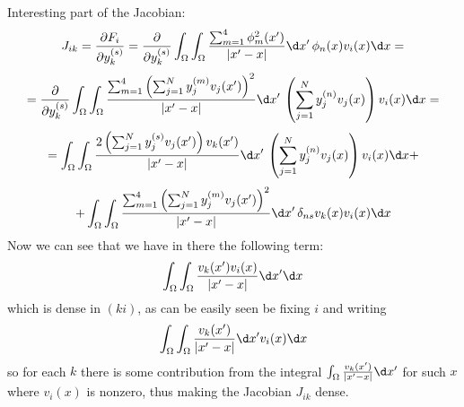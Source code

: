 \documentclass[11pt]{article}
\begin{document}
Interesting part of the Jacobian:
$$J_{ik} = {\partial F_i\over\partial y_k^{(s)}} =
{\partial\over\partial y_k^{(s)}}\int_\Omega \int_\Omega {
\sum_{m=1}^4 \phi_m^2(x')
\over|x' - x|}\d x'\,\phi_n(x) v_i(x) \d x =
$$
$$
=
{\partial\over\partial y_k^{(s)}}\int_\Omega \int_\Omega {
\sum_{m=1}^4 \left(\sum_{j=1}^N y_j^{(m)} v_j(x')\right)^2
\over|x' - x|}\d x'\, \left(\sum_{j=1}^N y_j^{(n)} v_j(x)\right)  v_i(x) \d x =
$$
$$
=
\int_\Omega \int_\Omega {
2 \left(\sum_{j=1}^N y_j^{(s)} v_j(x')\right)v_k(x')
\over|x' - x|}\d x'\, \left(\sum_{j=1}^N y_j^{(n)} v_j(x)\right)  v_i(x) \d x +
$$
$$+
\int_\Omega \int_\Omega {
\sum_{m=1}^4 \left(\sum_{j=1}^N y_j^{(m)} v_j(x')\right)^2
\over|x' - x|}\d x'\, \delta_{ns}v_k(x)  v_i(x) \d x
$$
Now we can see that we have in there the following term:
$$
\int_\Omega \int_\Omega {v_k(x') v_i(x)\over |x'-x|}\d x'\d x
$$
which is dense in $(ki)$, as can be easily seen be fixing $i$ and writing
$$
\int_\Omega \int_\Omega {v_k(x')\over |x'-x|}\d x' v_i(x)\d x
$$
so for each $k$ there is some contribution from the integral $ \int_\Omega
{v_k(x')\over |x'-x|}\d x' $ for such $x$ where $v_i(x)$ is nonzero, thus
making the Jacobian $J_{ik}$ dense.
\end{document}

